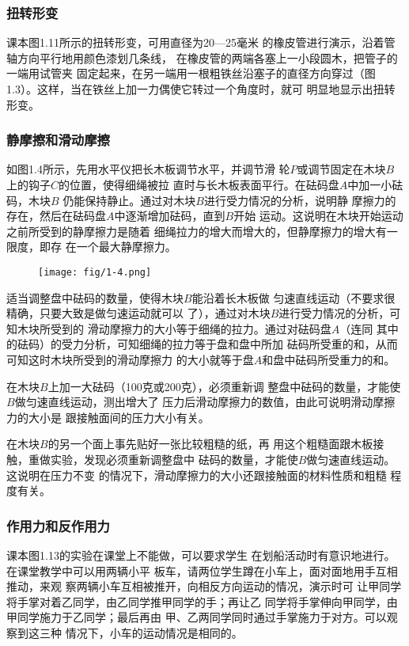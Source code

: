 \subsubsection{扭转形变}
课本图1.11所示的扭转形变，可用直径为20—25毫米
的橡皮管进行演示，沿着管轴方向平行地用颜色漆划几条线，
在橡皮管的两端各塞上一小段圆木，把管子的一端用试管夹
固定起来，在另一端用一根粗铁丝沿塞子的直径方向穿过（图
1.3）。这样，当在铁丝上加一力偶使它转过一个角度时，就可
明显地显示出扭转形变。


\subsubsection{静摩擦和滑动摩擦}
如图1.4所示，先用水平仪把长木板调节水平，并调节滑
轮$P$或调节固定在木块$B$上的钩子$C$的位置，使得细绳被拉
直时与长木板表面平行。在砝码盘$A$中加一小砝码，木块$B$
仍能保持静止。通过对木块$B$进行受力情况的分析，说明静
摩擦力的存在，然后在砝码盘$A$中逐渐增加砝码，直到$B$开始
运动。这说明在木块开始运动之前所受到的静摩擦力是随着
细绳拉力的增大而增大的，但静摩擦力的增大有一限度，即存
在一个最大静摩擦力。
\begin{figure}[htp]
    \centering
    \texttt{[image: fig/1-4.png]}
    \caption{}
\end{figure}

适当调整盘中砝码的数量，使得木块$B$能沿着长木板做
匀速直线运动（不要求很精确，只要大致是做匀速运动就可以
了），通过对木块$B$进行受力情况的分析，可知木块所受到的
滑动摩擦力的大小等于细绳的拉力。通过对砝码盘$A$（连同
其中的砝码）的受力分析，可知细绳的拉力等于盘和盘中所加
砝码所受重的和，从而可知这时木块所受到的滑动摩擦力
的大小就等于盘$A$和盘中砝码所受重力的和。

在木块$B$上加一大砝码（100克或200克），必须重新调
整盘中砝码的数量，才能使$B$做匀速直线运动，测出增大了
压力后滑动摩擦力的数值，由此可说明滑动摩擦力的大小是
跟接触面间的压力大小有关。

在木块$B$的另一个面上事先贴好一张比较粗糙的纸，再
用这个粗糙面跟木板接触，重做实验，发现必须重新调整盘中
砝码的数量，才能使$B$做匀速直线运动。这说明在压力不变
的情况下，滑动摩擦力的大小还跟接触面的材料性质和粗糙
程度有关。

\subsubsection{作用力和反作用力}
课本图1.13的实验在课堂上不能做，可以要求学生
在划船活动时有意识地进行。在课堂教学中可以用两辆小平
板车，请两位学生蹲在小车上，面对面地用手互相推动，来观
察两辆小车互相被推开，向相反方向运动的情况，演示时可
让甲同学将手掌对着乙同学，由乙同学推甲同学的手；再让乙
同学将手掌伸向甲同学，由甲同学施力于乙同学；最后再由
甲、乙两同学同时通过手掌施力于对方。可以观察到这三种
情况下，小车的运动情况是相同的。

